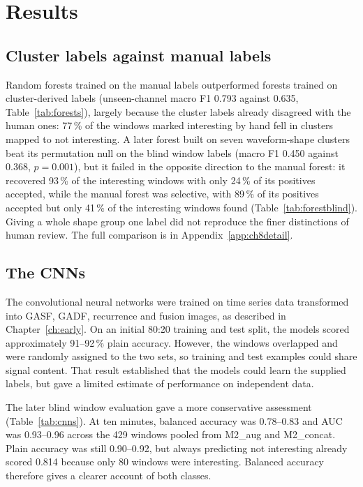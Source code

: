\section{Results}

\subsection{Cluster labels against manual labels}

Random forests trained on the manual labels outperformed forests trained on cluster-derived labels (unseen-channel macro F1 0.793 against 0.635, Table~\ref{tab:forests}), largely because the cluster labels already disagreed with the human ones: 77\,\% of the windows marked interesting by hand fell in clusters mapped to not interesting. A later forest built on seven waveform-shape clusters beat its permutation null on the blind window labels (macro F1 0.450 against 0.368, $p=0.001$), but it failed in the opposite direction to the manual forest: it recovered 93\,\% of the interesting windows with only 24\,\% of its positives accepted, while the manual forest was selective, with 89\,\% of its positives accepted but only 41\,\% of the interesting windows found (Table~\ref{tab:forestblind}). Giving a whole shape group one label did not reproduce the finer distinctions of human review. The full comparison is in Appendix~\ref{app:ch8detail}.

\subsection{The CNNs}

The convolutional neural networks were trained on time series data transformed into GASF, GADF, recurrence and fusion images, as described in Chapter~\ref{ch:early}. On an initial 80:20 training and test split, the models scored approximately 91--92\,\% plain accuracy. However, the windows overlapped and were randomly assigned to the two sets, so training and test examples could share signal content. That result established that the models could learn the supplied labels, but gave a limited estimate of performance on independent data.

The later blind window evaluation gave a more conservative assessment (Table~\ref{tab:cnns}). At ten minutes, balanced accuracy was 0.78--0.83 and AUC was 0.93--0.96 across the 429 windows pooled from M2\_aug and M2\_concat. Plain accuracy was still 0.90--0.92, but always predicting not interesting already scored 0.814 because only 80 windows were interesting. Balanced accuracy therefore gives a clearer account of both classes.

